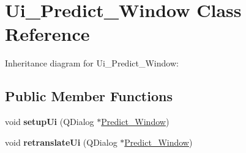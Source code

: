 \hypertarget{classUi__Predict__Window}{}\section{Ui\+\_\+\+Predict\+\_\+\+Window Class Reference}
\label{classUi__Predict__Window}


Inheritance diagram for Ui\+\_\+\+Predict\+\_\+\+Window\+:
\subsection*{Public Member Functions}
\begin{DoxyCompactItemize}
\item 
\mbox{\label{classUi__Predict__Window_aa52ec812ebae4838eb4ddde770d11eaa}} 
void {\bfseries setup\+Ui} (Q\+Dialog $\ast$\hyperlink{classPredict__Window}{Predict\+\_\+\+Window})
\item 
\mbox{\label{classUi__Predict__Window_a9c8556dd6368894bdf9314f9f4878fd6}} 
void {\bfseries retranslate\+Ui} (Q\+Dialog $\ast$\hyperlink{classPredict__Window}{Predict\+\_\+\+Window})
\end{DoxyCompactItemize}
